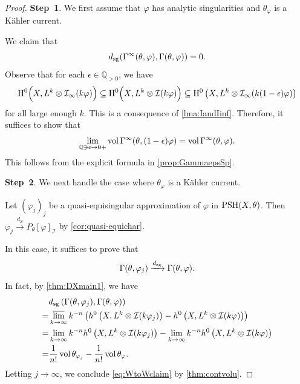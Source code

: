 \begin{proof}
    \textbf{Step~1}. We first assume that $\varphi$ has analytic singularities and $\theta_{\varphi}$ is a Kähler current.

    We claim that
    \begin{equation}\label{eq:Gamma0Gammaanalytic}
        d_{\mathrm{sg}}(\Gamma^{\infty}(\theta,\varphi),\Gamma(\theta,\varphi))=0.
    \end{equation}
    Observe that for each $\epsilon\in \mathbb{Q}_{>0}$, we have
    \[
    \mathrm{H}^0\Bigl(X,L^k\otimes \mathcal{I}_{\infty}(k\varphi)\Bigr)\subseteq \mathrm{H}^0\Bigl(X,L^k\otimes \mathcal{I}(k\varphi)\Bigr)\subseteq \mathrm{H}^0\left(X,L^k\otimes \mathcal{I}_{\infty}(k(1-\epsilon)\varphi)\right)
    \]
    for all large enough $k$. This is a consequence of \cref{lma:IandIinf}. Therefore, it suffices to show that
    \[
    \lim_{\mathbb{Q}\ni \epsilon\to 0+}\operatorname{vol} \Gamma^{\infty}(\theta,(1-\epsilon)\varphi)=\operatorname{vol} \Gamma^{\infty}(\theta,\varphi).
    \]
    This follows from the explicit formula in \cref{prop:GammaepsSp}.

    \textbf{Step~2}. We next handle the case where $\theta_{\varphi}$ is a Kähler current.

    Let $(\varphi_j)_j$ be a quasi-equisingular approximation of $\varphi$ in $\mathrm{PSH}(X,\theta)$. Then $\varphi_j\xrightarrow{d_S}P_{\theta}[\varphi]_{\mathcal{I}}$ by \cref{cor:quasi-equichar}.

In this case, it suffices to prove that
\begin{equation}\label{eq:WtoWclaim}
	\Gamma(\theta,\varphi_j)\xrightarrow{d_{\mathrm{sg}}} \Gamma(\theta,\varphi).
\end{equation}
In fact, by \cref{thm:DXmain1}, we have
\[
	\begin{aligned}
		&d_{\mathrm{sg}}\left(\Gamma(\theta,\varphi_j),\Gamma(\theta,\varphi)\right) \\
  =& \varlimsup_{k\to\infty} k^{-n} \left( h^0\left(X,L^k\otimes \mathcal{I}(k\varphi_j)\right)-h^0\left(X,L^k\otimes \mathcal{I}(k\varphi)\right)\right)\\
  = & \lim_{k\to\infty} k^{-n}h^0\left(X,L^k\otimes \mathcal{I}(k\varphi_j)\right)-\lim_{k\to\infty} k^{-n}h^0\left(X,L^k\otimes \mathcal{I}(k\varphi)\right) \\
		 =&\frac{1}{n!}\operatorname{vol} \theta_{\varphi_j}-\frac{1}{n!}\operatorname{vol} \theta_{\varphi}.
	\end{aligned}
\]
Letting $j\to\infty$, we conclude \eqref{eq:WtoWclaim} by \cref{thm:contvolu}.


\end{proof}
